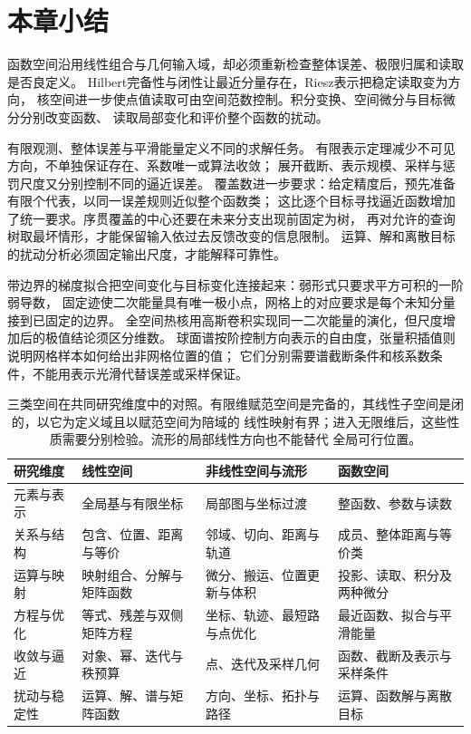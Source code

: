 \section{本章小结}
\label{sec:functional-summary}
\label{sec:functional-analysis-approximation-summary}


函数空间沿用线性组合与几何输入域，却必须重新检查整体误差、极限归属和读取是否良定义。
Hilbert完备性与闭性让最近分量存在，Riesz表示把稳定读取变为方向，
核空间进一步使点值读取可由空间范数控制。积分变换、空间微分与目标微分分别改变函数、
读取局部变化和评价整个函数的扰动。

有限观测、整体误差与平滑能量定义不同的求解任务。
有限表示定理减少不可见方向，不单独保证存在、系数唯一或算法收敛；
展开截断、表示规模、采样与惩罚尺度又分别控制不同的逼近误差。
覆盖数进一步要求：给定精度后，预先准备有限个代表，以同一误差规则近似整个函数类；
这比逐个目标寻找逼近函数增加了统一要求。序贯覆盖的中心还要在未来分支出现前固定为树，
再对允许的查询树取最坏情形，才能保留输入依过去反馈改变的信息限制。
运算、解和离散目标的扰动分析必须固定输出尺度，才能解释可靠性。

带边界的梯度拟合把空间变化与目标变化连接起来：弱形式只要求平方可积的一阶弱导数，
固定迹使二次能量具有唯一极小点，网格上的对应要求是每个未知分量接到已固定的边界。
全空间热核用高斯卷积实现同一二次能量的演化，但尺度增加后的极值结论须区分维数。
球面谱按阶控制方向表示的自由度，张量积插值则说明网格样本如何给出非网格位置的值；
它们分别需要谱截断条件和核系数条件，不能用表示光滑代替误差或采样保证。

\begin{table}[htbp]
\centering
\begin{tabularx}{\linewidth}{@{}lXXX@{}}
\toprule
研究维度 & 线性空间 & 非线性空间与流形 & 函数空间\\
\midrule
元素与表示 & 全局基与有限坐标 & 局部图与坐标过渡 & 整函数、参数与读数\\
关系与结构 & 包含、位置、距离与等价 & 邻域、切向、距离与轨道 & 成员、整体距离与等价类\\
运算与映射 & 映射组合、分解与矩阵函数 & 微分、搬运、位置更新与体积 & 投影、读取、积分及两种微分\\
方程与优化 & 等式、残差与双侧矩阵方程 & 坐标、轨迹、最短路与点优化 & 最近函数、拟合与平滑能量\\
收敛与逼近 & 对象、幂、迭代与秩预算 & 点、迭代及采样几何 & 函数、截断及表示与采样条件\\
扰动与稳定性 & 运算、解、谱与矩阵函数 & 方向、坐标、拓扑与路径 & 运算、函数解与离散目标\\
\bottomrule
\end{tabularx}
\caption{三类空间在共同研究维度中的对照。有限维赋范空间是完备的，其线性子空间是闭的，以它为定义域且以赋范空间为陪域的
线性映射有界；进入无限维后，这些性质需要分别检验。流形的局部线性方向也不能替代
全局可行位置。}
\label{tab:spaces-six-dimension-comparison}
\end{table}
